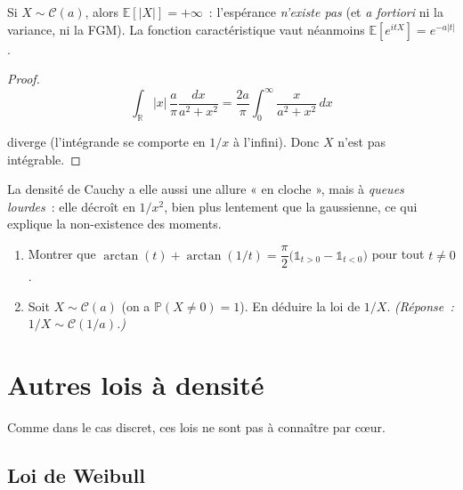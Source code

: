 \medskip

\begin{mdframed}
\begin{proposition}
\label{prop:cauchy-moments}
Si $X\sim\mathcal{C}(a)$, alors $\mathbb{E}[|X|]=+\infty$~: l'espérance \emph{n'existe pas}
(et \emph{a fortiori} ni la variance, ni la FGM). La fonction caractéristique
vaut néanmoins $\mathbb{E}[e^{itX}]=e^{-a|t|}$.
\end{proposition}
\end{mdframed}

\begin{proof}
$$
\displaystyle\int_\mathbb{R} |x|\,\frac a\pi\frac{dx}{a^2+x^2}
=\frac{2a}\pi\int_0^\infty\frac{x}{a^2+x^2}\,dx
$$

diverge (l'intégrande se comporte en $1/x$ à l'infini). Donc $X$ n'est pas intégrable.
\end{proof}

\begin{remarque}
La densité de Cauchy a elle aussi une allure « en cloche », mais à
\emph{queues lourdes}~: elle décroît en $1/x^2$, bien plus lentement que la
gaussienne, ce qui explique la non-existence des moments.
\end{remarque}

\begin{exercice}

\begin{enumerate}
  \item Montrer que $\arctan(t)+\arctan(1/t)=\dfrac\pi2\big(\mathbb{1}_{t>0}-\mathbb{1}_{t<0}\big)$
        pour tout $t\ne0$.
  \item Soit $X\sim\mathcal{C}(a)$ (on a $\mathbb{P}(X\ne0)=1$). En déduire la loi de
        $1/X$. \emph{(Réponse~: $1/X\sim\mathcal{C}(1/a)$.)}
\end{enumerate}
\end{exercice}

\newpage
\section{Autres lois à densité}

Comme dans le cas discret, ces lois ne sont pas à connaître par c\oe ur.

\subsection{Loi de Weibull}

